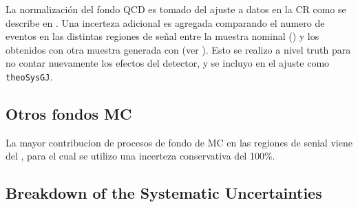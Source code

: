La normalización del fondo QCD {\gjet} es tomado del ajuste a datos en la CR como se describe en {\XXX}.
Una incerteza adicional es agregada comparando el numero de eventos en las distintas regiones de señal
entre la muestra nominal (\sherpa) y los obtenidos con otra muestra generada con {\pythia} (ver {\tab} \XXX).
Esto se realizo a nivel truth para no contar nuevamente los efectos del detector, y se incluyo en el ajuste
como \texttt{theoSysGJ}.



\subsection{Otros fondos MC}

La mayor contribucion de procesos de fondo de MC en las regiones de senial viene del
{\zgam}, para el cual se utilizo una incerteza conservativa del 100\%.


\subsection{Breakdown of the Systematic Uncertainties}\label{sec:syst_break}
